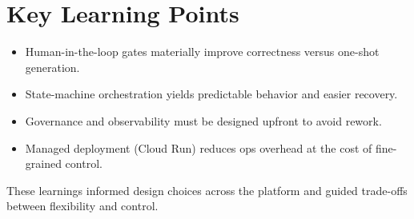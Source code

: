 \section{Key Learning Points}
\label{sec:TrackB_Learnings}

\begin{itemize}
    \item Human-in-the-loop gates materially improve correctness versus one-shot generation.
    \item State-machine orchestration yields predictable behavior and easier recovery.
    \item Governance and observability must be designed upfront to avoid rework.
    \item Managed deployment (Cloud Run) reduces ops overhead at the cost of fine-grained control.
\end{itemize}

These learnings informed design choices across the platform and guided trade-offs between flexibility and control.